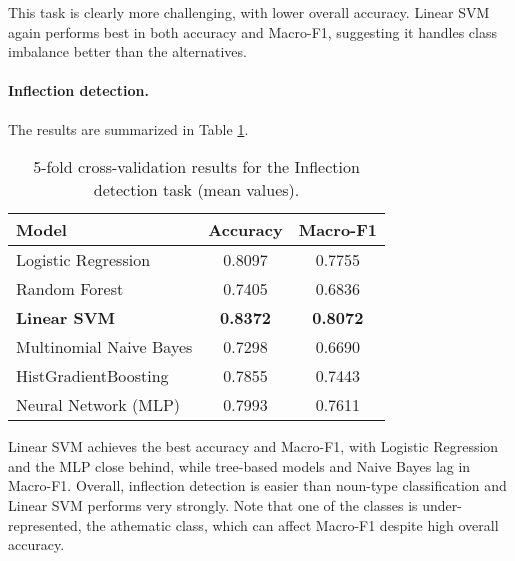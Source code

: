 This task is clearly more challenging, with lower overall accuracy.  
Linear SVM again performs best in both accuracy and Macro-F1, suggesting it handles class imbalance better than the alternatives.

\paragraph{Inflection detection.} The results are summarized in Table \ref{table:inflection-results}.
\begin{table}[H]
\centering
\caption{5-fold cross-validation results for the Inflection detection task (mean values).}
\label{table:inflection-results}
\small
\renewcommand{\arraystretch}{1.1}
\begin{tabular}{|l|c|c|}
\hline
\textbf{Model} & \textbf{Accuracy} & \textbf{Macro-F1} \\
\hline
Logistic Regression      & 0.8097          & 0.7755 \\
Random Forest            & 0.7405          & 0.6836 \\
\textbf{Linear SVM}      & \textbf{0.8372} & \textbf{0.8072} \\
Multinomial Naive Bayes  & 0.7298          & 0.6690 \\
HistGradientBoosting     & 0.7855          & 0.7443 \\
Neural Network (MLP)     & 0.7993          & 0.7611 \\
\hline
\end{tabular}
\end{table}

Linear SVM achieves the best accuracy and Macro-F1, with Logistic Regression and the MLP close behind, while tree-based models and Naive Bayes lag in Macro-F1.  
Overall, inflection detection is easier than noun-type classification and Linear SVM performs very strongly.  
Note that one of the classes is under-represented, the athematic class, which can affect Macro-F1 despite high overall accuracy.

